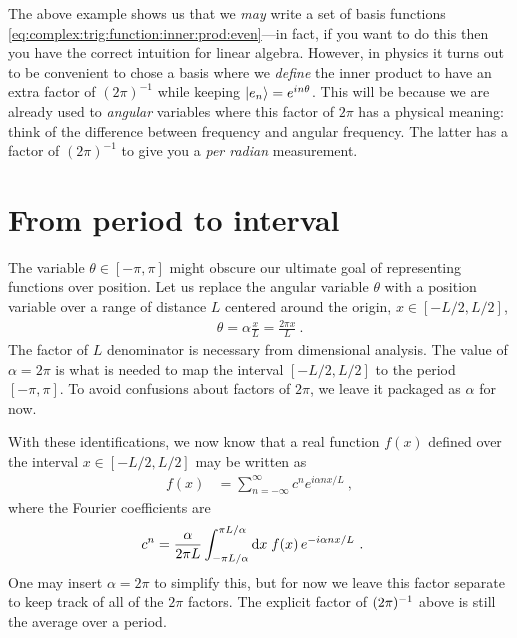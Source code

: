 The above example shows us that we \emph{may} write a set of basis functions \eqref{eq:complex:trig:function:inner:prod:even}---in fact, if you want to do this then you have the correct intuition for linear algebra. However, in physics it turns out to be convenient to chose a basis where we \emph{define} the inner product to have an extra factor of $(2\pi)^{-1}$ while keeping $\left|e_n\right\rangle = e^{in\theta}$. This will be because we are already used to \emph{angular} variables where this factor of $2\pi$ has a physical meaning: think of the difference between frequency and angular frequency. The latter has a factor of $(2\pi)^{-1}$ to give you  a \emph{per radian} measurement.





\section{From period to interval}

The variable $\theta \in [-\pi, \pi]$ might obscure our ultimate goal of representing functions over position. Let us replace the angular variable $\theta$ with a position variable over a range of distance $L$ centered around the origin, $x \in [-{L}/{2},L/2]$,
\begin{align}
    \theta = \alpha \frac{x}{L} = \frac{2\pi x}{L} \ .
\end{align}
The factor of $L$ denominator is necessary from dimensional analysis. The value of $\alpha = 2\pi$ is what is needed to map the interval $[-L/2,L/2]$ to the period $[-\pi,\pi]$. To avoid confusions about factors of $2\pi$, we leave it packaged as $\alpha$ for now. 

With these identifications, we now know that a real {function} $f(x)$ defined over the interval $x\in[-L/2,L/2]$ may be written as
\begin{align}
    f(x) &= \sum_{n=-\infty}^\infty c^n e^{i\alpha n x/L} \ ,
    \label{eq:fourier:interval:complex}
\end{align}
where the Fourier coefficients are
\begin{align}
    c^n &= \frac{\alpha}{2\pi L} \int_{-\pi L/\alpha}^{\pi L/\alpha} \operatorname{d}\mkern-3mu^{}\mkern-1mu{x}\; f(x)\, e^{-i\alpha n x/L} \ .
    \label{eq:fourier:interval:complex:coefficient}
\end{align}
One may insert $\alpha = 2\pi$ to simplify this, but for now we leave this factor separate to keep track of all of the $2\pi$ factors. The explicit factor of $(2\pi)^{-1}$ above is still the average over a period.


